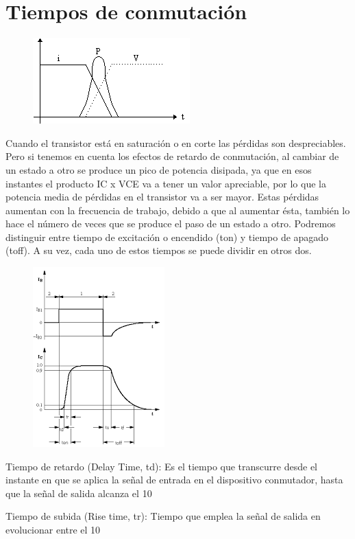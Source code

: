 \documentclass[10pt,letterpaper]{article}
\begin{document}
\section{Tiempos de conmutación}
\begin{figure}[h!]
\centering 
\includegraphics[scale=1]{3}
\end{figure}
Cuando el transistor está en saturación o en corte las pérdidas son despreciables. Pero si tenemos en cuenta los efectos de retardo de conmutación, al cambiar de un estado a otro se produce un pico de potencia disipada, ya que en esos instantes el producto IC x VCE va a tener un valor apreciable, por lo que la potencia media de pérdidas en el transistor va a ser mayor. Estas pérdidas aumentan con la frecuencia de trabajo, debido a que al aumentar ésta, también lo hace el número de veces que se produce el paso de un estado a otro.
Podremos distinguir entre tiempo de excitación o encendido (ton) y tiempo de apagado (toff). A su vez, cada uno de estos tiempos se puede dividir en otros dos.
\begin{figure}[h!]
\centering 
\includegraphics[scale=1]{2}
\end{figure}
\newpage
Tiempo de retardo (Delay Time, td): Es el tiempo que transcurre desde el instante en que se aplica la señal de entrada en el dispositivo conmutador, hasta que la señal de salida alcanza el 10%

Tiempo de subida (Rise time, tr): Tiempo que emplea la señal de salida en evolucionar entre el 10%
\end{document}
